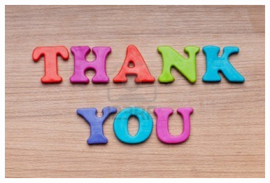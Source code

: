 \documentclass[mathserif]{beamer}
\begin{document}
\begin{frame}
\centering
\begin{figure}[b]
\includegraphics[width=0.9\linewidth]{thankyou}
\end{figure}
\end{frame}
\end{document}
